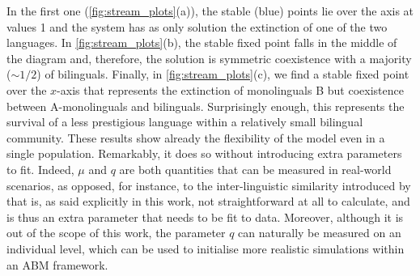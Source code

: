 \documentclass[../thesis.tex]{subfiles}
\begin{document}
In the first one (\cref{fig:stream_plots}(a)), the stable (blue) points lie over the
axis at values 1 and the system has as only solution the extinction of one of the two
languages. In \cref{fig:stream_plots}(b), the stable fixed point falls in the middle of
the diagram and, therefore, the solution is symmetric coexistence with a majority ($\sim
1/2$) of bilinguals. Finally, in \cref{fig:stream_plots}(c), we find a stable fixed
point over the $x$-axis that represents the extinction of monolinguals B but coexistence
between A-monolinguals and bilinguals. Surprisingly enough, this represents the survival
of a less prestigious language within a relatively small bilingual community. These
results show already the flexibility of the model even in a single population.
Remarkably, it does so without introducing extra parameters to fit. Indeed, $\mu$ and
$q$ are both quantities that can be measured in real-world scenarios, as opposed, for
instance, to the inter-linguistic similarity introduced by
\cite{MiraInterlinguisticSimilarity2005} that is, as said explicitly in this work, not
straightforward at all to calculate, and is thus an extra parameter that needs to be fit
to data. Moreover, although it is out of the scope of this work, the parameter $q$ can
naturally be measured on an individual level, which can be used to initialise more
realistic simulations within an \ac{ABM} framework.
\end{document}
